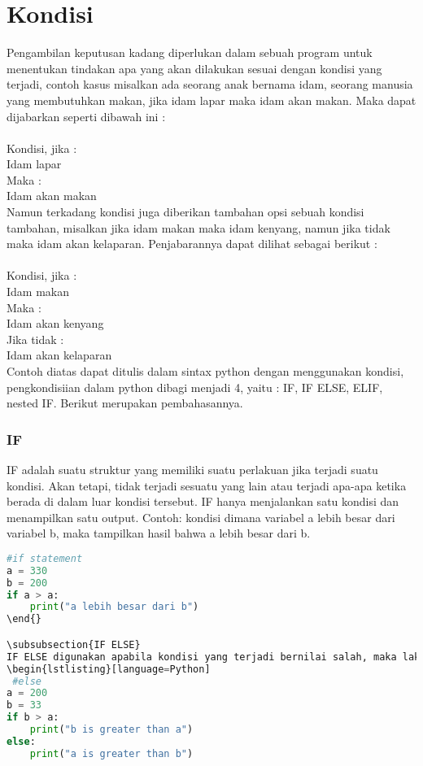 \section{Kondisi}
Pengambilan keputusan kadang diperlukan dalam sebuah program untuk menentukan tindakan apa yang akan dilakukan sesuai dengan kondisi yang terjadi, contoh kasus misalkan ada seorang anak bernama idam, seorang manusia yang membutuhkan makan, jika idam lapar maka idam akan makan. Maka dapat dijabarkan seperti dibawah ini :\\
\\
Kondisi, jika : \\
Idam lapar \\
Maka : \\
Idam akan makan\\
Namun terkadang kondisi juga diberikan tambahan opsi sebuah kondisi tambahan, misalkan jika idam makan maka idam kenyang, namun jika tidak maka idam akan kelaparan. Penjabarannya dapat dilihat sebagai berikut :\\
\\
Kondisi, jika :\\
 Idam makan \\
 Maka : \\
 Idam akan kenyang \\
 Jika tidak : \\
 Idam akan kelaparan\\
Contoh diatas dapat ditulis dalam sintax python dengan menggunakan kondisi, pengkondisiian dalam python dibagi menjadi 4, yaitu : IF, IF ELSE, ELIF, nested IF. Berikut merupakan pembahasannya.

\subsubsection{IF}
 IF  adalah suatu struktur yang memiliki suatu perlakuan jika terjadi suatu kondisi. Akan tetapi, tidak terjadi sesuatu yang lain atau terjadi apa-apa ketika berada di dalam luar kondisi tersebut. IF hanya menjalankan satu kondisi dan menampilkan satu output. Contoh: kondisi dimana variabel a lebih besar dari variabel b, maka tampilkan hasil bahwa a lebih besar dari b.
\begin{lstlisting}[language=Python]
#if statement 
a = 330 
b = 200 
if a > a: 
	print("a lebih besar dari b")
\end{}

\subsubsection{IF ELSE}
IF ELSE digunakan apabila kondisi yang terjadi bernilai salah, maka lakukan else. Contoh: kondisi dimana variabel a lebih besar dari variabel b, maka jika b lebih besar dari a, tampiilkan hasil b lebih besar dari a, jika salah maka tampilkan a lebih besar dari pada b
\begin{lstlisting}[language=Python]
 #else 
a = 200 
b = 33 
if b > a: 
	print("b is greater than a") 
else: 
	print("a is greater than b")
\end{lstlisting}

